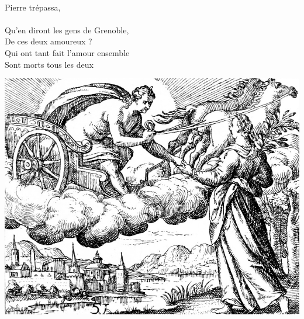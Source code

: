 \\Pierre trépassa,  \bissimple
\\\\Qu'en diront les gens de Grenoble,
\\De ces deux amoureux ?
\\Qui ont tant fait l'amour ensemble
\\Sont morts tous les deux  \bissimple
\bigskip
\bigskip
\begin{center}
\includegraphics[width=1\textwidth]{images/brev14.png}
\end{center}

\breakpage
